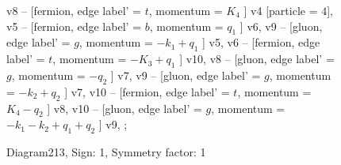 \documentclass{revtex4}
\begin{document}
\begin{figure}[!htb]
\begin{center}
{v8 -- [fermion, edge label' = \(t\), momentum = \(K_{4}\) ] v4 [particle = \(4\)], 
v5 -- [fermion, edge label' = \(b\), momentum = \(q_{1}\) ] v6, 
v9 -- [gluon, edge label' = \(g\), momentum = \(-k_{1} + q_{1}\) ] v5, 
v6 -- [fermion, edge label' = \(t\), momentum = \(-K_{3} + q_{1}\) ] v10, 
v8 -- [gluon, edge label' = \(g\), momentum = \(-q_{2}\) ] v7, 
v9 -- [gluon, edge label' = \(g\), momentum = \(-k_{2} + q_{2}\) ] v7, 
v10 -- [fermion, edge label' = \(t\), momentum = \(K_{4} - q_{2}\) ] v8, 
v10 -- [gluon, edge label' = \(g\), momentum = \(-k_{1} - k_{2} + q_{1} + q_{2}\) ] v9, 
};
\end{center}
\caption{Diagram213, Sign: 1, Symmetry factor: 1}
\end{figure}
\newpage
\end{document}
